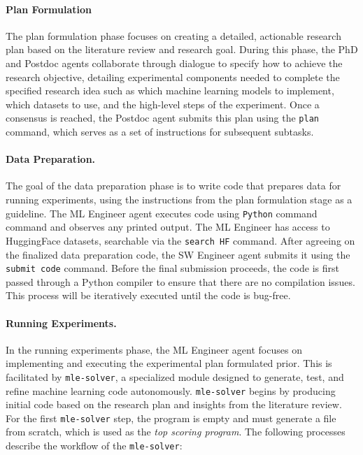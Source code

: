\documentclass[11pt, a4paper]{gdm_format}
\begin{document}
\paragraph{Plan Formulation} The plan formulation phase focuses on creating a detailed, actionable research plan based on the literature review and research goal. During this phase, the PhD and Postdoc agents collaborate through dialogue to specify how to achieve the research objective, detailing experimental components needed to complete the specified research idea such as which machine learning models to implement, which datasets to use, and the high-level steps of the experiment. Once a consensus is reached, the Postdoc agent submits this plan using the \texttt{plan} command, which serves as a set of instructions for subsequent subtasks.




\paragraph{Data Preparation.} The goal of the data preparation phase is to write code that prepares data for running experiments, using the instructions from the plan formulation stage as a guideline. The ML Engineer agent executes code using \texttt{Python} command command and observes any printed output. The ML Engineer has access to HuggingFace datasets, searchable via the \texttt{search HF} command. After agreeing on the finalized data preparation code, the SW Engineer agent submits it using the \texttt{submit code} command. Before the final submission proceeds, the code is first passed through a Python compiler to ensure that there are no compilation issues. This process will be iteratively executed until the code is bug-free.


\paragraph{Running Experiments.} In the running experiments phase, the ML Engineer agent focuses on implementing and executing the experimental plan formulated prior. This is facilitated by \texttt{mle-solver}, a specialized module designed to generate, test, and refine machine learning code autonomously. \texttt{mle-solver} begins by producing initial code based on the research plan and insights from the literature review. For the first \texttt{mle-solver} step, the program is empty and must generate a file from scratch, which is used as the \textit{top scoring program}. The following processes describe the workflow of the \texttt{mle-solver}:
\end{document}
